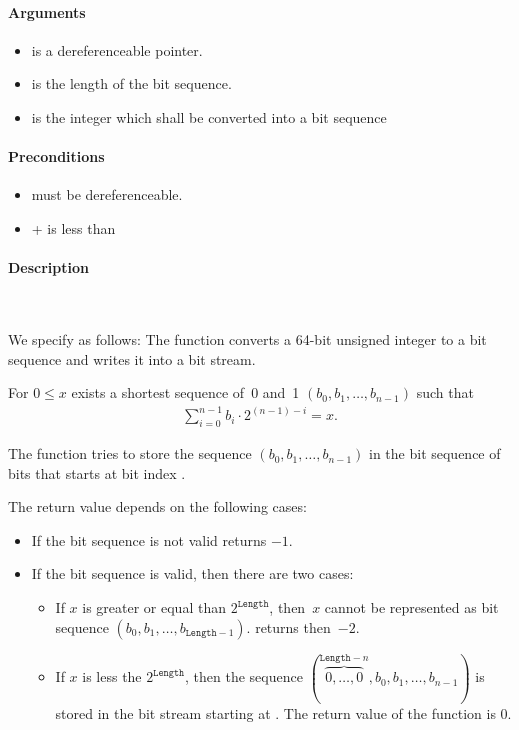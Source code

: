 \paragraph{Arguments}

\begin{itemize}
   \item  {} is a dereferenceable pointer.
   \item {} is the length of the bit sequence.
   \item {} is the integer which shall be converted into a bit sequence
\end{itemize}

\paragraph{Preconditions}
\begin{itemize}
    \item  {} must be dereferenceable.
    \item {} +  is less than 
\end{itemize}

\paragraph{Description}~

We specify \pokenext as follows:
The function \poke converts a 64-bit unsigned integer to a bit sequence and 
writes it into a bit stream.

For $0 \leq x$ exists a shortest sequence of~0 and~1
$(b_0, b_1,\ldots,b_{n - 1})$
such that
\begin{align}
    \sum_{i=0}^{n-1} b_i \cdot 2^{(n - 1) - i} = x.
\end{align}

The function \pokenext tries to store the sequence $(b_0, b_1,\ldots,b_{n - 1})$
in the bit sequence of  bits that starts
at bit index .

The return value depends on  the following cases:
\begin{itemize}
    \item  If the bit sequence is not valid \peeknext  returns $-1$.
    \item  If the bit sequence is valid, then there are two cases:
\begin{itemize}
\item
If $x$ is greater or equal than $2^\mathtt{Length}$, then~$x$
cannot be represented as bit sequence $(b_0, b_1,\ldots,b_{\mathtt{Length} - 1})$.
\pokenext returns then~$-2$.

\item
If $x$ is less the $2^{\mathtt{Length}}$, then  the sequence
$(\overbrace{0,\ldots,0}^{\mathtt{Length}-n},b_0, b_1,\ldots,b_{n - 1})$
is stored in the bit stream starting at .
The return value of the function \pokenext is 0.

\end{itemize}
\end{itemize}

